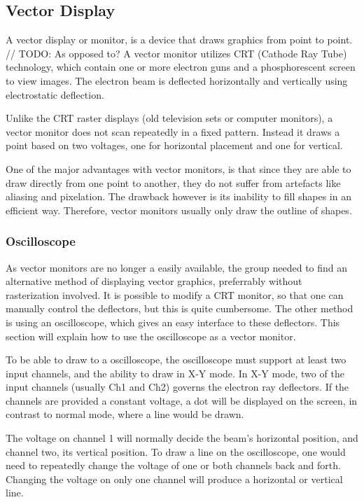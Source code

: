 \subsection{Vector Display}
A vector display or monitor, is a device that draws graphics from point to point.
// TODO: As opposed to?
A vector monitor utilizes CRT (Cathode Ray Tube) technology, which contain one or more electron guns and a phosphorescent screen to view images.
The electron beam is deflected horizontally and vertically using electrostatic deflection. \cite{vector-monitor}

Unlike the CRT raster displays (old television sets or computer monitors), a vector monitor does not scan repeatedly in a fixed pattern.
Instead it draws a point based on two voltages, one for horizontal placement and one for vertical.

One of the major advantages with vector monitors,
is that since they are able to draw directly from one point to another,
they do not suffer from artefacts like aliasing and pixelation.
The drawback however is its inability to fill shapes in an efficient way.
Therefore, vector monitors usually only draw the outline of shapes.

\subsubsection{Oscilloscope}
As vector monitors are no longer a easily available, the group needed to find an alternative method of displaying vector graphics, preferrably without rasterization involved.
It is possible to modify a CRT monitor, so that one can manually control the deflectors, but this is quite cumbersome.
The other method is using an oscilloscope, which gives an easy interface to these deflectors.
This section will explain how to use the oscilloscope as a vector monitor.


To be able to draw to a oscilloscope, the oscilloscope must support at least two input channels, and the ability to draw in X-Y mode.
In X-Y mode, two of the input channels (usually Ch1 and Ch2) governs the electron ray deflectors.
If the channels are provided a constant voltage, a dot will be displayed on the screen, in contrast to normal mode, where  a line would be drawn.

The voltage on channel 1 will normally decide the beam's horizontal position, and channel two, its vertical position.
To draw a line on the oscilloscope, one would need to repeatedly change the voltage of one or both channels back and forth.
Changing the voltage on only one channel will produce a horizontal or vertical line.
